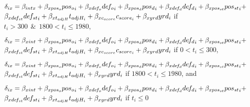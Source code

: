 \documentclass[12pt,twoside]{dukestatscithesis}
\begin{document}
\(\delta_{ix} = \beta_{intx} + \beta_{xpos_o}{pos_o}_{i} + \beta_{xde\hspace{-0.1em}f_o}{de\hspace{-0.1em}f_o}_i + \beta_{xpos_d}{pos_d}_i + \beta_{xde\hspace{-0.1em}f_d}{de\hspace{-0.1em}f_d}_i + \beta_{xpos_{st}}{pos_{st}}_i + \:\)\\
\(\beta_{xde\hspace{-0.1em}f_{st}}{de\hspace{-0.1em}f_{st}}_i + \beta_{xt_{adjH}}t_{adjH_i} + \beta_{xc_{score}}c_{score_i} + \beta_{xyrd}yrd_i\) if \(t_i > 300 \:\: \& \:\: 1800 < t_i \leq 1980\),

\(\delta_{ix} = \beta_{xint} + \beta_{xpos_o}{pos_o}_i + \beta_{xde\hspace{-0.1em}f_o}{de\hspace{-0.1em}f_o}_i + \beta_{xpos_d}{pos_d}_i + \beta_{xde\hspace{-0.1em}f_d}{de\hspace{-0.1em}f_d}_i + \beta_{xpos_{st}}{pos_{st}}_i + \:\)\\
\(\beta_{xde\hspace{-0.1em}f_{st}}{de\hspace{-0.1em}f_{st}}_i + \beta_{xt_{adjH}}t_{adjH_i} + \beta_{xc_{score}}c_{score_i} + \beta_{xyrd}yrd_i\) if \(0 < t_i \leq 300\),

\(\delta_{ix} = \beta_{xint} + \beta_{xpos_o}{pos_o}_i + \beta_{xde\hspace{-0.1em}f_o}{de\hspace{-0.1em}f_o}_i + \beta_{xpos_d}{pos_d}_i + \beta_{xde\hspace{-0.1em}f_d}{de\hspace{-0.1em}f_d}_i + \beta_{xpos_{st}}{pos_{st}}_i + \:\)\\
\(\beta_{xde\hspace{-0.1em}f_{st}}{de\hspace{-0.1em}f_{st}}_i + \beta_{xt_{adjH}}t_{adjH_i} + \beta_{xyrd}yrd_i\) if \(1800 < t_i \leq 1980\), and

\(\delta_{ix} = \beta_{xint} + \beta_{xpos_o}{pos_o}_i + \beta_{xde\hspace{-0.1em}f_o}{de\hspace{-0.1em}f_o}_i + \beta_{xpos_d}{pos_d}_i + \beta_{xde\hspace{-0.1em}f_d}{de\hspace{-0.1em}f_d}_i + \beta_{xpos_{st}}{pos_{st}}_i + \:\)\\
\(\beta_{xde\hspace{-0.1em}f_{st}}{de\hspace{-0.1em}f_{st}}_i + \beta_{xt_{adjH}}t_{adjH_i} + \beta_{xyrd}yrd_i\) if \(t_i \leq 0\)
\end{document}
